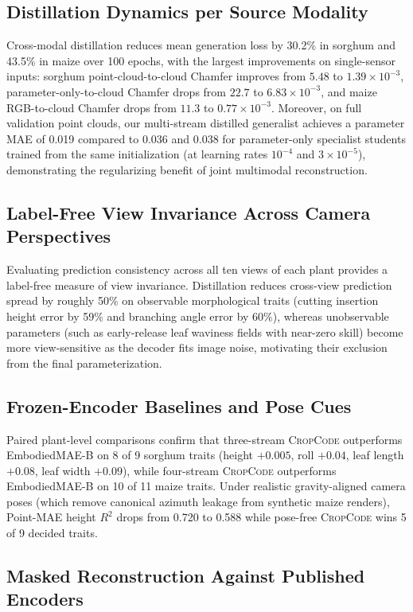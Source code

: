 \documentclass[10pt,twocolumn,letterpaper]{article}
\newcommand{\method}{\textsc{CropCode}}
\begin{document}
\subsection{Distillation Dynamics per Source Modality}
Cross-modal distillation reduces mean generation loss by 30.2\% in sorghum and 43.5\% in maize over 100 epochs, with the largest improvements on single-sensor inputs: sorghum point-cloud-to-cloud Chamfer improves from $5.48$ to $1.39 \times 10^{-3}$, parameter-only-to-cloud Chamfer drops from $22.7$ to $6.83 \times 10^{-3}$, and maize RGB-to-cloud Chamfer drops from $11.3$ to $0.77 \times 10^{-3}$. Moreover, on full validation point clouds, our multi-stream distilled generalist achieves a parameter MAE of 0.019 compared to 0.036 and 0.038 for parameter-only specialist students trained from the same initialization (at learning rates $10^{-4}$ and $3 \times 10^{-5}$), demonstrating the regularizing benefit of joint multimodal reconstruction.

\subsection{Label-Free View Invariance Across Camera Perspectives}
Evaluating prediction consistency across all ten views of each plant provides a label-free measure of view invariance. Distillation reduces cross-view prediction spread by roughly 50\% on observable morphological traits (cutting insertion height error by 59\% and branching angle error by 60\%), whereas unobservable parameters (such as early-release leaf waviness fields with near-zero skill) become more view-sensitive as the decoder fits image noise, motivating their exclusion from the final parameterization.

\subsection{Frozen-Encoder Baselines and Pose Cues}
Paired plant-level comparisons confirm that three-stream \method{} outperforms EmbodiedMAE-B on 8 of 9 sorghum traits (height $+0.005$, roll $+0.04$, leaf length $+0.08$, leaf width $+0.09$), while four-stream \method{} outperforms EmbodiedMAE-B on 10 of 11 maize traits. Under realistic gravity-aligned camera poses (which remove canonical azimuth leakage from synthetic maize renders), Point-MAE height $R^2$ drops from 0.720 to 0.588 while pose-free \method{} wins 5 of 9 decided traits.

\subsection{Masked Reconstruction Against Published Encoders}
\label{sec:supp-recon}
\end{document}
